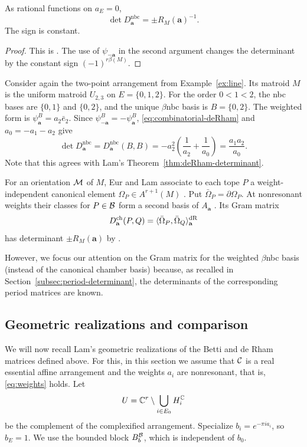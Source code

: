 \begin{theorem}[Lam]\label{thm:deRham-determinant}
As rational functions on $a_E=0$,
\[
 \det D_{\mathbf a}^{\mathrm{nbc}}=\pm R_M(\mathbf a)^{-1}.
\]
The sign is constant.
\end{theorem}
\begin{proof}
This is \cite[Corollary 7.20]{Lam}.
The use of $\psi_{-\mathbf a}$ in the second argument changes the
determinant by the constant sign $(-1)^{r\beta(M)}$.
\end{proof}

\begin{example}\label{ex:line2}
Consider again the two-point arrangement from Example~\ref{ex:line}.
Its matroid $M$ is the uniform matroid $U_{2,3}$ on $E=\{0,1,2\}$.
For the order $0<1<2$, the nbc bases are $\{0,1\}$ and $\{0,2\}$,
and the unique $\beta$nbc basis is $B=\{0,2\}$.
The weighted form is $\psi^B_{\mathbf a}=a_2\bar e_2$.
Since $\psi^B_{-\mathbf a}=-\psi^B_{\mathbf a}$,
\eqref{eq:combinatorial-deRham} and $a_0=-a_1-a_2$ give
\[
 \det D_{\mathbf a}^{\mathrm{nbc}} = D_{\mathbf a}^{\mathrm{nbc}}(B,B)
 =-a_2^2\left(\frac1{a_2}+\frac1{a_0}\right)
 =\frac{a_1a_2}{a_0}.
\]
Note that this agrees with Lam's Theorem~\ref{thm:deRham-determinant}.
\end{example}

\begin{remark}\label{rem:chamber-deRham}
For an orientation $\mathcal M$ of $M$, Eur and Lam associate to each tope $P$ a weight-independent canonical
element $\Omega_P\in A^{r+1}(M)$ \cite[Theorem 2.11]{EurLam}.
Put $\bar\Omega_P=\partial\Omega_P$.
At nonresonant weights their classes for $P\in\mathcal B$ form a second
basis of $A_{\mathbf a}$ \cite[Corollary 7.14]{Lam}. Its Gram matrix
\[
 D_{\mathbf a}^{\mathrm{ch}}(P,Q)
 =\langle\bar\Omega_P,\bar\Omega_Q\rangle^{\mathrm{dR}}_{\mathbf a}
\]
has determinant $\pm R_M(\mathbf a)$ by
\cite[Theorem 7.18]{Lam}.

However, we focus our attention on the Gram matrix for the weighted $\beta$nbc basis (instead of the canonical chamber basis) because, as recalled in Section~\ref{subsec:period-determinant}, the determinants of the corresponding period matrices are known.
\end{remark}

\subsection{Geometric realizations and comparison}\label{subsec:geometric-comparison}
We will now recall Lam's geometric realizations of the Betti and de Rham matrices defined above. For this, in this section we assume that $\mathcal C$ is a real essential affine arrangement
and the weights $a_i$ are nonresonant, that is, \eqref{eq:weights} holds.
Let
\[
 U=\mathbb C^r\setminus\bigcup_{i\in E_0}H_i^{\mathbb C}
\]
be the complement of the complexified arrangement. Specialize
$b_i=e^{-\pi i a_i}$, so $b_E=1$. We use the bounded block
$B_b^{\mathcal B}$, which is independent of $b_0$.

